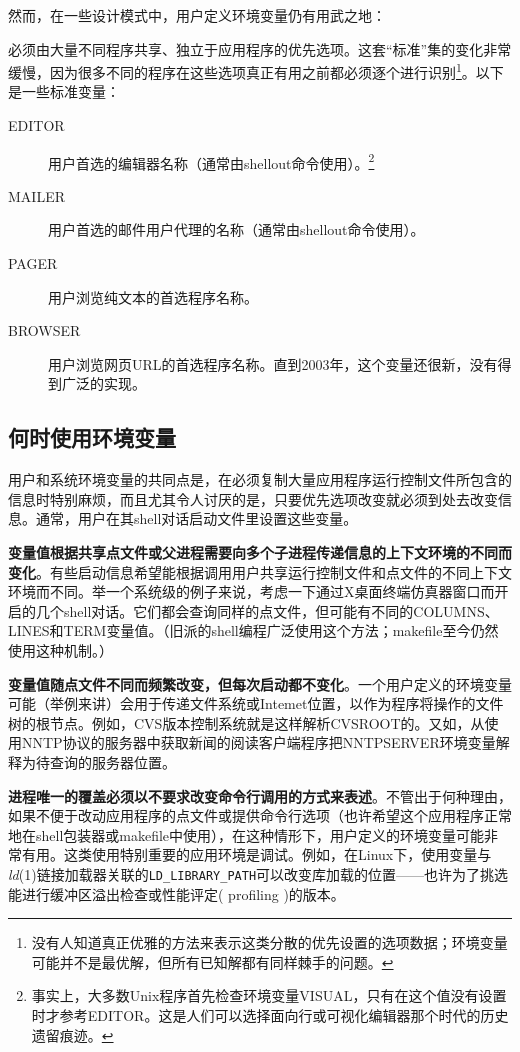 \documentclass[12pt,oneside]{book}
\begin{document}
\begin{common-format}
然而，在一些设计模式中，用户定义环境变量仍有用武之地：

必须由大量不同程序共享、独立于应用程序的优先选项。这套“标准”集的变化非常缓慢，因为很多不同的程序在这些选项真正有用之前都必须逐个进行识别\footnote{没有人知道真正优雅的方法来表示这类分散的优先设置的选项数据；环境变量可能并不是最优解，但所有已知解都有同样棘手的问题。}。以下是一些标准变量：
\begin{description}
\item[EDITOR] 用户首选的编辑器名称（通常由shellout命令使用）。\footnote{事实上，大多数Unix程序首先检查环境变量VISUAL，只有在这个值没有设置时才参考EDITOR。这是人们可以选择面向行或可视化编辑器那个时代的历史遗留痕迹。}
\item[MAILER] 用户首选的邮件用户代理的名称（通常由shellout命令使用）。
\item[PAGER] 用户浏览纯文本的首选程序名称。
\item[BROWSER] 用户浏览网页URL的首选程序名称。直到2003年，这个变量还很新，没有得到广泛的实现。
\end{description}


\subsection{何时使用环境变量}
用户和系统环境变量的共同点是，在必须复制大量应用程序运行控制文件所包含的信息时特别麻烦，而且尤其令人讨厌的是，只要优先选项改变就必须到处去改变信息。通常，用户在其shell对话启动文件里设置这些变量。

\textbf{变量值根据共享点文件或父进程需要向多个子进程传递信息的上下文环境的不同而变化}。有些启动信息希望能根据调用用户共享运行控制文件和点文件的不同上下文环境而不同。举一个系统级的例子来说，考虑一下通过X桌面终端仿真器窗口而开启的几个shell对话。它们都会查询同样的点文件，但可能有不同的COLUMNS、LINES和TERM变量值。（旧派的shell编程广泛使用这个方法；makefile至今仍然使用这种机制。）

\textbf{变量值随点文件不同而频繁改变，但每次启动都不变化}。一个用户定义的环境变量可能（举例来讲）会用于传递文件系统或Intemet位置，以作为程序将操作的文件树的根节点。例如，CVS版本控制系统就是这样解析CVSROOT的。又如，从使用NNTP协议的服务器中获取新闻的阅读客户端程序把NNTPSERVER环境变量解释为待查询的服务器位置。

\textbf{进程唯一的覆盖必须以不要求改变命令行调用的方式来表述}。不管出于何种理由，如果不便于改动应用程序的点文件或提供命令行选项（也许希望这个应用程序正常地在shell包装器或makefile中使用），在这种情形下，用户定义的环境变量可能非常有用。这类使用特别重要的应用环境是调试。例如，在Linux下，使用变量与\textit{ld}(1)链接加载器关联的\verb+LD_LIBRARY_PATH+可以改变库加载的位置——也许为了挑选能进行缓冲区溢出检查或性能评定( profiling )的版本。


\end{common-format}
\end{document}
